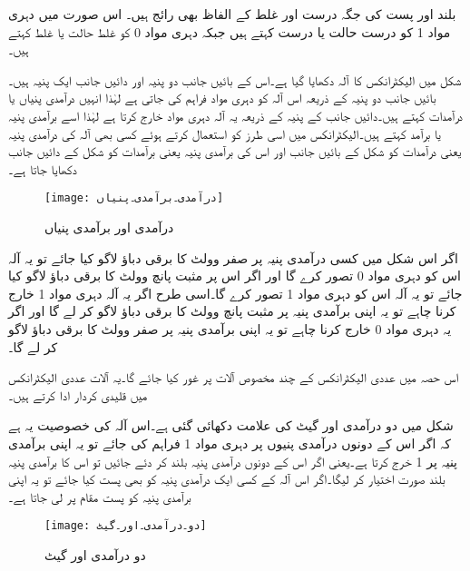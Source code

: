 بلند اور پست کی جگہ درست اور غلط کے الفاظ بھی رائج ہیں۔ اس صورت میں دہری مواد 1 کو درست حالت  یا درست  کہتے ہیں جبکہ دہری مواد 0 کو غلط حالت  یا غلط  کہتے ہیں۔


شکل  میں الیکٹرانکس کا آلہ دکھایا گیا ہے۔اس کے بائیں جانب دو پنیہ اور دائیں جانب ایک پنیہ ہیں۔بائیں جانب دو پنیہ کے ذریعہ اس آلہ کو دہری مواد فراہم کی جاتی ہے لہٰذا  انہیں درآمدی پنیاں  یا درآمدات  کہتے ہیں۔دائیں جانب کے پنیہ کے ذریعہ یہ آلہ دہری مواد خارج کرتا ہے لہٰذا اسے برآمدی پنیہ  یا برآمد  کہتے ہیں۔الیکٹرانکس میں اسی طرز کو استعمال کرتے ہوئے کسی بھی آلہ کی درآمدی پنیہ یعنی درآمدات کو شکل کے بائیں جانب اور اس کی برآمدی پنیہ یعنی برآمدات کو شکل کے دائیں جانب دکھایا جاتا ہے۔


\begin{figure}[th]
 \begin{center}
  \texttt{[image: درآمدی۔برآمدی۔پنیاں]}
 \end{center}
\caption{درآمدی اور برآمدی پنیاں}
\label{شکل۔درآمدی۔برآمدی۔پنیاں}
\end{figure}


اگر اس شکل میں کسی درآمدی پنیہ پر صفر وولٹ کا برقی دباؤ لاگو کیا جائے تو یہ آلہ اس کو دہری مواد 0 تصور کرے گا اور اگر  اس پر مثبت پانچ وولٹ کا برقی دباؤ لاگو کیا جائے تو یہ آلہ اس کو دہری مواد 1 تصور کرے گا۔اسی طرح اگر یہ آلہ دہری مواد 1 خارج کرنا چاہے تو یہ اپنی برآمدی پنیہ پر مثبت پانچ وولٹ کا برقی دباؤ لاگو کر لے گا اور اگر یہ دہری مواد 0 خارج کرنا چاہے تو یہ اپنی برآمدی پنیہ پر صفر وولٹ کا برقی دباؤ لاگو کر لے گا۔

اس حصہ میں عددی الیکٹرانکس کے چند مخصوص آلات پر غور کیا جائے گا۔یہ آلات عددی الیکٹرانکس میں قلیدی کردار ادا کرتے ہیں۔

شکل  میں دو درآمدی اور گیٹ  کی علامت دکھائی گئی ہے۔اس آلہ کی خصوصیت یہ ہے کہ اگر اس کے دونوں درآمدی پنیوں پر دہری مواد 1 فراہم کی جائے تو یہ اپنی برآمدی پنیہ پر 1 خرج کرتا ہے۔یعنی اگر اس کے دونوں درآمدی پنیہ بلند کر دئے جائیں تو اس کا برآمدی پنیہ بلند صورت اختیار کر لیگا۔اگر اس آلہ کے کسی ایک درآمدی پنیہ کو بھی پست کیا جائے تو یہ اپنی برآمدی پنیہ کو پست مقام پر لی جاتا ہے۔

\begin{figure}[th]
 \begin{center}
  \texttt{[image: دو۔درآمدی۔اور۔گیٹ]}
 \end{center}
\caption{دو درآمدی اور گیٹ}
\label{شکل۔دو۔درآمدی۔اور۔گیٹ}
\end{figure}

